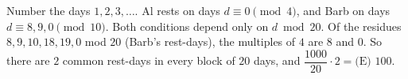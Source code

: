 Number the days $1,2,3,\dots$. Al rests on days $d\equiv0\pmod4$, and Barb on days $d\equiv8,9,0\pmod{10}$. Both conditions depend only on $d\bmod20$. Of the residues $8,9,10,18,19,0$ mod $20$ (Barb's rest-days), the multiples of $4$ are $8$ and $0$. So there are $2$ common rest-days in every block of $20$ days, and $\dfrac{1000}{20}\cdot2=\boxed{\text{(E) }100}$.
